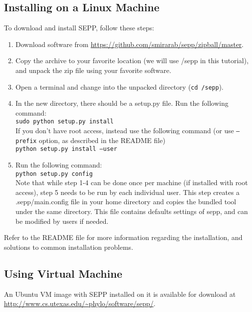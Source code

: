 \documentclass[11pt]{article} %
\newcommand{\sepp}{SEPP\xspace}
\newcommand{\ins}[1]{{\tt #1}}
\newcommand{\file}[1]{{\sf #1}}
\newcommand{\sepphome} {\file{{\raise.17ex\hbox{$\scriptstyle\sim$}}/sepp}\xspace}
\begin{document}
\subsection{Installing on a Linux Machine}
To download and install \sepp, follow these steps:

\begin{enumerate}
\item Download software from \url{https://github.com/smirarab/sepp/zipball/master}. 
\item Copy the archive to your favorite location (we will use \sepphome in this tutorial), and unpack the zip file using your favorite software. 
\item Open a terminal and change into the unpacked directory (\ins{cd \sepphome}). 
\item In the new directory, there should be a \file{setup.py} file. Run the following command:\\

\ins{sudo python setup.py install}\\

If you don't have root access, instead use the following command (or use \ins{--prefix} option, as described in the \file{README} file)\\

\ins{python setup.py install --user}

\item Run the following command:\\

\ins{python setup.py config}\\

Note that while step 1-4 can be done once per machine (if installed with root access), step 5 needs to be run by each individual user.
This step creates a \file{.sepp/main.config} file in your home directory and copies the bundled tool under the same directory. This file contains defaults settings of sepp, and can be modified by users if needed.

\end{enumerate}
Refer to the README file for more information regarding the installation, and solutions to common installation problems. 

\subsection{Using Virtual Machine}
An Ubuntu VM image with \sepp installed on it is available for download at \url{http://www.cs.utexas.edu/~phylo/software/sepp/}.  
\end{document}
